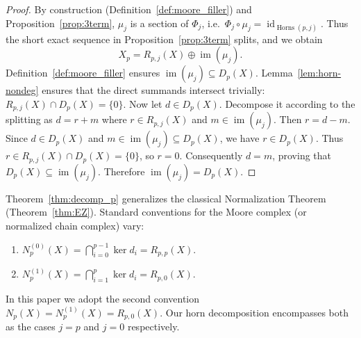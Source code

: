 \begin{proof}
By construction (Definition~\ref{def:moore_filler}) and Proposition~\ref{prop:3term},
$\mu_j$ is a section of $\Phi_j$, i.e.\ $\Phi_j\circ\mu_j=\operatorname{id}_{\operatorname{Horns}(p,j)}$.
Thus the short exact sequence in Proposition~\ref{prop:3term} splits, and we obtain
\[
X_p = R_{p,j}(X) \oplus \operatorname{im}(\mu_j).
\]
Definition~\ref{def:moore_filler} ensures $\operatorname{im}(\mu_j)\subseteq D_p(X)$.
Lemma~\ref{lem:horn-nondeg} ensures that the direct summands intersect trivially: $R_{p,j}(X) \cap D_p(X) = \{0\}$.
Now let $d \in D_p(X)$. Decompose it according to the splitting as $d = r + m$ where $r \in R_{p,j}(X)$ and $m \in \operatorname{im}(\mu_j)$.
Then $r = d - m$. Since $d \in D_p(X)$ and $m \in \operatorname{im}(\mu_j) \subseteq D_p(X)$, we have $r \in D_p(X)$.
Thus $r \in R_{p,j}(X) \cap D_p(X) = \{0\}$, so $r=0$.
Consequently $d = m$, proving that $D_p(X) \subseteq \operatorname{im}(\mu_j)$.
Therefore $\operatorname{im}(\mu_j) = D_p(X)$.
\end{proof}

\begin{remark}
Theorem~\ref{thm:decomp_p} generalizes the classical Normalization Theorem (Theorem~\ref{thm:EZ}). Standard conventions for the Moore complex (or normalized chain complex) vary:
\begin{enumerate}
    \item $N_p^{(0)}(X) = \bigcap_{i=0}^{p-1} \ker d_i = R_{p,p}(X)$.
    \item $N_p^{(1)}(X) = \bigcap_{i=1}^{p} \ker d_i = R_{p,0}(X)$.
\end{enumerate}
In this paper we adopt the second convention $N_p(X)=N_p^{(1)}(X)=R_{p,0}(X)$. Our horn decomposition encompasses both as the cases $j=p$ and $j=0$ respectively.
\end{remark}


